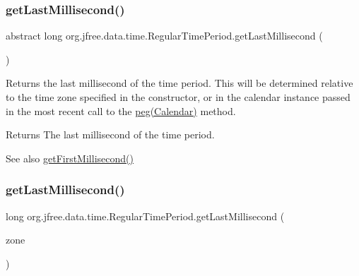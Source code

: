 \subsubsection{\texorpdfstring{get\+Last\+Millisecond()}{getLastMillisecond()}\hspace{0.1cm}{\footnotesize\ttfamily [1/3]}}
{\footnotesize\ttfamily abstract long org.\+jfree.\+data.\+time.\+Regular\+Time\+Period.\+get\+Last\+Millisecond (\begin{DoxyParamCaption}{ }\end{DoxyParamCaption})\hspace{0.3cm}{\ttfamily [abstract]}}

Returns the last millisecond of the time period. This will be determined relative to the time zone specified in the constructor, or in the calendar instance passed in the most recent call to the \mbox{\hyperlink{classorg_1_1jfree_1_1data_1_1time_1_1_regular_time_period_ae3251d790d4e91328a451b741bfa1e37}{peg(\+Calendar)}} method.

\begin{DoxyReturn}{Returns}
The last millisecond of the time period.
\end{DoxyReturn}
\begin{DoxySeeAlso}{See also}
\mbox{\hyperlink{classorg_1_1jfree_1_1data_1_1time_1_1_regular_time_period_a7aa230d10a6d78c81db0b74dce832526}{get\+First\+Millisecond()}} 
\end{DoxySeeAlso}
\mbox{\label{classorg_1_1jfree_1_1data_1_1time_1_1_regular_time_period_aaeb1a139a8046725c6827b0db023efd8}} 
\subsubsection{\texorpdfstring{get\+Last\+Millisecond()}{getLastMillisecond()}\hspace{0.1cm}{\footnotesize\ttfamily [2/3]}}
{\footnotesize\ttfamily long org.\+jfree.\+data.\+time.\+Regular\+Time\+Period.\+get\+Last\+Millisecond (\begin{DoxyParamCaption}\item[{Time\+Zone}]{zone }\end{DoxyParamCaption})}

